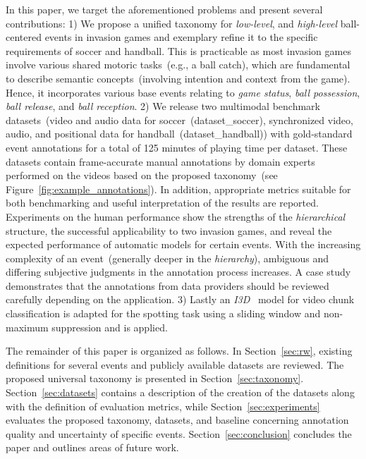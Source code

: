 In this paper, we target the aforementioned problems and present several contributions: 1) We propose a unified taxonomy for \textit{low-level}, and \textit{high-level} ball-centered events in invasion games and exemplary refine it to the specific requirements of soccer and handball. This is practicable as most invasion games involve various shared motoric tasks~(e.g., a ball catch), which are fundamental to describe semantic concepts~(involving intention and context from the game).
Hence, it incorporates various base events relating to \textit{game status}, \textit{ball possession}, \textit{ball release}, and \textit{ball reception}.
2) We release two multimodal benchmark datasets~(video and audio data for soccer~(\acrshort{dataset_soccer}), synchronized video, audio, and positional data for handball~(\acrshort{dataset_handball})) with gold-standard event annotations for a total of 125 minutes of playing time per dataset.
These datasets contain frame-accurate manual annotations by domain experts performed on the videos based on the proposed taxonomy~(see Figure~\ref{fig:example_annotations}).
In addition, appropriate metrics suitable for both benchmarking and useful interpretation of the results are reported.
Experiments on the human performance show the strengths of the \textit{hierarchical} structure, the successful applicability to two invasion games, and reveal the expected performance of automatic models for certain events.
With the increasing complexity of an event~(generally deeper in the \textit{hierarchy}), ambiguous and differing subjective judgments in the annotation process increases.
A case study demonstrates that the annotations from data providers should be reviewed carefully depending on the application.
3) Lastly an \emph{I3D}~\cite{carreira2017quo} model for video chunk classification is adapted for the spotting task using a sliding window and non-maximum suppression and is applied.

The remainder of this paper is organized as follows. 
In Section~\ref{sec:rw}, existing definitions for several events and publicly available datasets are reviewed. The proposed universal taxonomy is presented in Section~\ref{sec:taxonomy}.
Section~\ref{sec:datasets} contains a description of the creation of the datasets along with the definition of evaluation metrics, while Section~\ref{sec:experiments} evaluates the proposed taxonomy, datasets, and baseline concerning annotation quality and uncertainty of specific events. 
Section~\ref{sec:conclusion} concludes the paper and outlines areas of future work.

